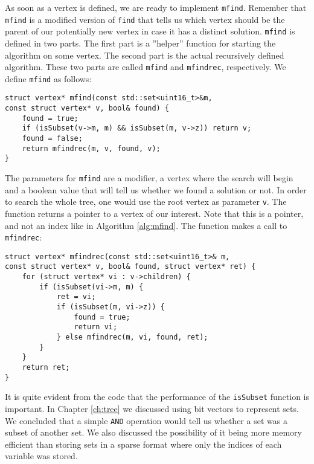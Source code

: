 As soon as a vertex is defined, we are ready to implement \texttt{mfind}.
Remember that \texttt{mfind} is a modified version of \texttt{find} that tells
us which vertex should be the parent of our potentially new vertex in case it
has a distinct solution.
\texttt{mfind} is defined in two parts. The first part is a ''helper'' function
for starting the algorithm on some vertex. The second part is the actual
recursively defined algorithm. These two parts are called \texttt{mfind} and
\texttt{mfindrec}, respectively. We define \texttt{mfind} as follows:
\begin{verbatim}
struct vertex* mfind(const std::set<uint16_t>&m,
const struct vertex* v, bool& found) {
    found = true;
    if (isSubset(v->m, m) && isSubset(m, v->z)) return v;
    found = false;
    return mfindrec(m, v, found, v);
}
\end{verbatim}
The parameters for \texttt{mfind} are a modifier, a vertex where the search
will begin and a boolean value that will tell us whether we found a
solution or not.
In order to search the whole tree, one would use the root vertex as parameter
\texttt{v}. The function returns a pointer to a vertex of our interest.
Note that this is a pointer, and not an index like in Algorithm
\ref{alg:mfind}. The function makes a call to \texttt{mfindrec}:
\begin{verbatim}
struct vertex* mfindrec(const std::set<uint16_t>& m,
const struct vertex* v, bool& found, struct vertex* ret) {
    for (struct vertex* vi : v->children) {
        if (isSubset(vi->m, m) {
            ret = vi;
            if (isSubset(m, vi->z)) {
                found = true;
                return vi;
            } else mfindrec(m, vi, found, ret);
        }
    }
    return ret;
}
\end{verbatim}
It is quite evident from the code that the performance of the \texttt{isSubset}
function is important. In Chapter \ref{ch:tree} we discussed using bit vectors 
to represent sets. We concluded that a simple \texttt{AND} operation would tell
us whether a set was a subset of another set.
We also discussed the possibility of it being more memory efficient than
storing sets in a sparse format where only the indices of each variable was
stored.

